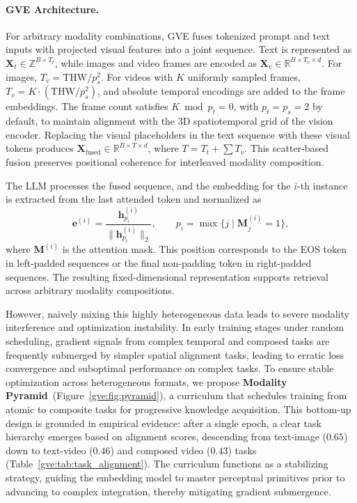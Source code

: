 \paragraph{GVE Architecture.}
For arbitrary modality combinations, GVE fuses tokenized prompt and text inputs with projected visual features into a joint sequence. Text is represented as $\mathbf{X}_t \in \mathbb{Z}^{B \times T_t}$, while images and video frames are encoded as $\mathbf{X}_v \in \mathbb{R}^{B \times T_v \times d}$. For images, $T_v=\mathrm{THW}/p_s^2$. For videos with $K$ uniformly sampled frames, $T_v=K\cdot(\mathrm{THW}/p_s^2)$, and absolute temporal encodings are added to the frame embeddings. The frame count satisfies $K \bmod p_t=0$, with $p_t=p_s=2$ by default, to maintain alignment with the 3D spatiotemporal grid of the vision encoder. Replacing the visual placeholders in the text sequence with these visual tokens produces $\mathbf{X}_{\mathrm{fused}} \in \mathbb{R}^{B \times T \times d}$, where $T=T_t+\sum T_v$. This scatter-based fusion preserves positional coherence for interleaved modality composition.

The LLM processes the fused sequence, and the embedding for the $i$-th instance is extracted from the last attended token and normalized as
\begin{equation}
    \mathbf{e}^{(i)} = \frac{\mathbf{h}^{(i)}_{p_i}}{\|\mathbf{h}^{(i)}_{p_i}\|_2}, \qquad
    p_i = \max \{j \mid \mathbf{M}^{(i)}_j=1\},
\end{equation}
where $\mathbf{M}^{(i)}$ is the attention mask. This position corresponds to the EOS token in left-padded sequences or the final non-padding token in right-padded sequences. The resulting fixed-dimensional representation supports retrieval across arbitrary modality compositions.

However, naively mixing this highly heterogeneous data leads to severe modality interference and optimization instability. In early training stages under random scheduling, gradient signals from complex temporal and composed tasks are frequently submerged by simpler spatial alignment tasks, leading to erratic loss convergence and suboptimal performance on complex tasks.
To ensure stable optimization across heterogeneous formats, we propose \textbf{Modality Pyramid}~(Figure~\ref{gve:fig:pyramid}), a curriculum that schedules training from atomic to composite tasks for progressive knowledge acquisition. This bottom-up design is grounded in empirical evidence: after a single epoch, a clear task hierarchy emerges based on alignment scores, descending from text-image ($0.65$) down to text-video ($0.46$) and composed video ($0.43$) tasks (Table~\ref{gve:tab:task_alignment}). The curriculum functions as a stabilizing strategy, guiding the embedding model to master perceptual primitives prior to advancing to complex integration, thereby mitigating gradient submergence.

